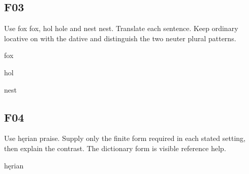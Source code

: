 
\subsection*{F03}

Use fox fox, hol hole and nest nest. Translate each sentence. Keep ordinary locative on with the dative and distinguish the two neuter plural patterns.

fox

hol

nest






\subsection*{F04}

Use hęrian praise. Supply only the finite form required in each stated setting, then explain the contrast. The dictionary form is visible reference help.

hęrian


